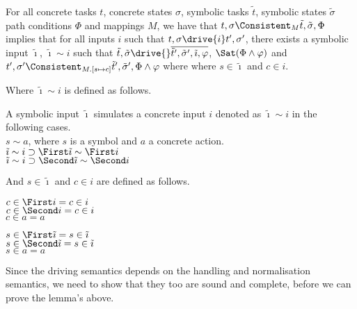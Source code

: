 \begin{lemma}
  \label{lem:completedriving}
  For all concrete tasks $t$, concrete states $\sigma$, symbolic tasks $\tilde{t}$, symbolic states $\tilde{\sigma}$ path conditions $\Phi$ and mappings $M$,
  we have that $t,\sigma\Consistent_{M}\tilde{t},\tilde{\sigma},\Phi$ implies
  that for all inputs $i$ such that $t,\sigma\drive{i}t',\sigma'$,
  there exists a symbolic input $\tilde{\imath}$, $\tilde{\imath}\sim i$ such that
  $\tilde{t},\tilde{\sigma}\drive{}\overline{\tilde{t}',\tilde{\sigma}',\tilde{\imath},\phi}$, $\Sat(\Phi\land\phi)$ and $t',\sigma'\Consistent_{M.[s\mapsto c]}\tilde{t}',\tilde{\sigma}',\Phi\land\phi$ where where $s\in\tilde{\imath}$ and $c\in i$.
\end{lemma}

Where $\tilde{\imath}\sim i$ is defined as follows.

\begin{definition}
  A symbolic input $\tilde{\imath}$ simulates a concrete input $i$ denoted as $\tilde{\imath}\sim i$ in the following cases.\\
  $s\sim a$, where $s$ is a symbol and $a$ a concrete action.\\
  $\tilde{\imath}\sim i\implies \First \tilde{\imath} \sim \First i$\\
  $\tilde{\imath}\sim i\implies \Second \tilde{\imath} \sim \Second i$
\end{definition}

And $s\in \tilde{\imath}$ and $c\in i$ are defined as follows.

\begin{definition}
  $c\in \First i = c\in i $\\
  $c\in \Second i = c\in i $\\
  $c\in a = a $
\end{definition}

\begin{definition}
  $s\in \First \tilde{\imath} = s\in \tilde{\imath} $\\
  $s\in \Second \tilde{\imath} = s\in \tilde{\imath} $\\
  $s\in a = a $
\end{definition}

Since the driving semantics depends on the handling and normalisation semantics, we need to show that they too are sound and complete, before we can prove the lemma's above.


